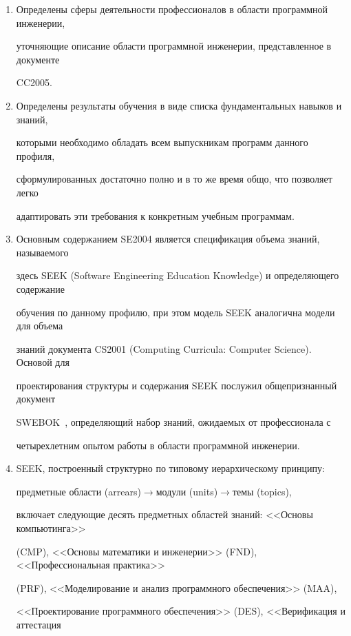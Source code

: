 \begin{enumerate}[1.]

\item 

 Определены сферы деятельности профессионалов в области программной инженерии, 

уточняющие описание области программной инженерии, представленное в документе 

CC2005.

\item 

 Определены результаты обучения в виде списка фундаментальных навыков и знаний, 

которыми необходимо обладать всем выпускникам программ данного профиля, 

сформулированных достаточно полно и в то же время общо, что позволяет легко 

адаптировать эти требования к конкретным учебным программам. 

\item 

 Основным содержанием SE2004 является спецификация объема знаний, называемого 

здесь SEEK (Software Engineering Education Knowledge) и определяющего содержание 

обучения по данному профилю, при этом модель SEEK аналогична модели для объема 

знаний документа CS2001 (Computing Curricula: Computer Science). Основой для 

проектирования структуры и содержания SEEK послужил общепризнанный документ 

SWEBOK~\cite{21-s}, определяющий набор знаний, ожидаемых от профессионала с 

четырехлетним опытом работы в области программной инженерии. 

\item  SEEK, построенный структурно по типовому иерархическому принципу: 

предметные области (arrears)\;$\rightarrow$\;модули (units)\;$\rightarrow$\;темы (topics), 

включает следующие десять предметных областей знаний: <<Основы компьютинга>> 

(CMP), <<Основы математики и инженерии>> (FND), <<Профессиональная практика>> 

(PRF), <<Моделирование и анализ программного обеспечения>> (MAA), 

<<Проектирование программного обеспечения>> (DES), <<Верификация и аттестация 


\end{enumerate}
